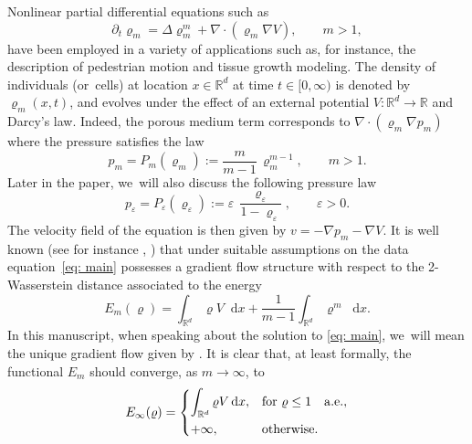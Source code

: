 \documentclass[11pt]{article}
\numberwithin{equation}{section}
\newcommand{\dx}[1]{\mathop{}\!\mathrm{d} #1}
\newcommand{\R}{\mathbb{R}}
\theoremstyle{plain}
\theoremstyle{remark}
\begin{document}
Nonlinear partial differential equations such as
\begin{equation}\label{eq: main}
\partial_{t} \varrho_m = \Delta \varrho_m^m + \nabla \cdot (\varrho_m \nabla V), \qquad m>1,
\end{equation}
have been employed in a variety of applications such as, for instance, the description of pedestrian motion and tissue growth modeling. The density of individuals (or~cells) at location $x\in\R^d$ at time $t \in [0,\infty)$ is denoted by $\varrho_m(x,t)$, and evolves under the effect of an external potential $V:\R^d\to\R$ and Darcy's law. Indeed, the porous medium term corresponds to $\nabla \cdot(\varrho_m\nabla p_m)$ where the pressure satisfies the law
\begin{equation}\label{eq: pressure power law}
p_m= P_m(\varrho_m):=\frac{m}{m-1}\, \varrho_m^{m-1}, \qquad m>1.
\end{equation}
Later in the paper, we~will also discuss the following pressure law
\begin{equation}
\label{singular pressure}
p_\varepsilon= P_\varepsilon(\varrho_\varepsilon):= \varepsilon\, \frac{\varrho_\varepsilon}{1-\varrho_\varepsilon}, \qquad \varepsilon>0.
\end{equation}
The velocity field of the equation is then given by $v = -\nabla p_m -\nabla V$.
It is well known (see for instance \cite[Th.\,11.2.8]{AGS2008}, \cite{Otto}) that under suitable assumptions on the data equation~\eqref{eq: main} possesses a gradient flow structure with respect to the 2\nobreakdash-Wasserstein distance associated to the energy
\begin{equation*}
\label{eq: energy}
E_m(\varrho)= \int_{\R^d} \varrho V \dx x + \frac{1}{m-1}\int_{\R^d} \varrho^m \dx x.
\end{equation*}
In this manuscript, when speaking about the solution to \eqref{eq: main}, we~will mean the unique gradient flow given by \cite[Th.\,11.2.8]{AGS2008}.
It is clear that, at least formally, the functional $E_m$ should converge, as $m\to\infty$, to
\begin{equation*}\label{eq: energy infty}
E_\infty(\varrho)=
\begin{dcases}
\int_{\R^d} \varrho V \dx x, &\text{for } \varrho\leq 1 \quad\mathrm{a.e.},\\
+\infty, &\text{otherwise.}
\end{dcases}
\end{equation*}
\end{document}
